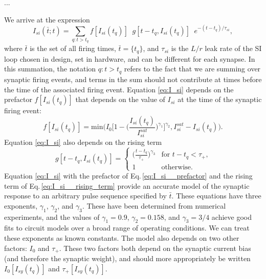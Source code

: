 \documentclass[]{article}
\begin{document}
...


We arrive at the expression
\begin{equation}
\label{eq:I_si}
I_{si}(\bar{t};t) = \sum_{q: t>t_{q}} f[I_{si}(t_{q})]\phantom{a}g[t-t_q,I_{si}(t_{q})]\phantom{a}e^{-(t-t_{q})/\tau_{si}},
\end{equation}
where $\bar{t}$ is the set of all firing times, $\bar{t} = \{t_q\}$, and $\tau_{si}$ is the $L/r$ leak rate of the SI loop chosen in design, set in hardware, and can be different for each synapse. In this summation, the notation $q:t>t_q$ refers to the fact that we are summing over synaptic firing events, and terms in the sum should not contribute at times before the time of the associated firing event. Equation \ref{eq:I_si} depends on the prefactor $f[I_{si}(t_q)]$ that depends on the value of $I_{si}$ at the time of the synaptic firing event:
\begin{equation}
\label{eq:I_si__prefactor}
f[I_{si}(t_q)] = \mathrm{min}\bigg(I_0\bigg[1-\bigg(\frac{I_{si}(t_q)}{I_{si}^{sat}}\bigg)^{\gamma_1}\bigg]^{\gamma_2},I_{si}^{sat}-I_{si}(t_q)\bigg).
\end{equation}
Equation \ref{eq:I_si} also depends on the rising term
\begin{equation}
\label{eq:I_si__rising_term}
g[t-t_q,I_{si}(t_q)]= 
\begin{cases}
   \bigg(\frac{t-t_q}{\tau_+}\bigg)^{\gamma_3} & \text{for }t-t_q<\tau_+\text{,}\\
    1              & \text{otherwise.}
\end{cases}
\end{equation}
Equation \ref{eq:I_si} with the prefactor of Eq.\,\ref{eq:I_si__prefactor} and the rising term of Eq.\,\ref{eq:I_si__rising_term} provide an accurate model of the synaptic response to an arbitrary pulse sequence specified by $\bar{t}$. These equations have three exponents, $\gamma_1$, $\gamma_2$, and $\gamma_3$. These have been determined from numerical experiments, and the values of $\gamma_1 = 0.9$, $\gamma_2 = 0.158$, and $\gamma_3 = 3/4$ achieve good fits to circuit models over a broad range of operating conditions. We can treat these exponents as known constants. The model also depends on two other factors: $I_0$ and $\tau_+$. These two factors both depend on the synaptic current bias (and therefore the synaptic weight), and should more appropriately be written $I_0[I_{sy}(t_q)]$ and $\tau_+[I_{sy}(t_q)]$. 
\end{document}
